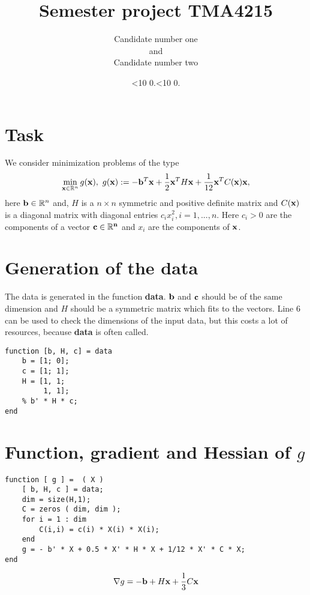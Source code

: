 \documentclass[a4paper,12pt]{article}
\newcommand{\leadingzero}[1]{\ifnum #1<10 0\the#1\else\the#1\fi}
\newcommand{\mytoday}{\leadingzero{\day}.\leadingzero{\month}.\the\year}
\newcommand{\code}[1]{\textbf{#1}}
\begin{document}
\title{Semester project TMA4215}
\author{Candidate number one \\ and\\ Candidate number two}
\date{\mytoday}
\maketitle
\newpage


\section{Task}
We consider minimization problems of the type
\begin{align*}
\min_{{\bf x} \in \mathbb{R}^n} g({\bf x}),\,\, g({\bf x}):=-{\bf b}^T{\bf x} + \frac12{\bf x}^TH{\bf x}+\frac1{12}{\bf x}^TC({\bf x}){\bf x},
\end{align*}
here ${\bf b} \in \mathbb{R}^n$ and, $H$ is a $n \times n$ symmetric and positive definite matrix and $C(\bf{x})$ is a diagonal
matrix with diagonal entries $c_i x^2_i, i = 1, . . . , n$. 
Here $c_i > 0$ are the components of a vector $\bf{c} \in \mathbb{R}^n$ 
and $x_i$ are the components of $\bf{x}$. 
\section{Generation of the data}
The data is generated in the function \code{data}.
$\bf{b}$ and $\bf{c}$ should be of the same dimension and $H$ should be a symmetric matrix which fits to the vectors.
Line 6 can be used to check the dimensions of the input data, but this costs a lot of resources, because \code{data} is often called. 
\begin{lstlisting}
function [b, H, c] = data
	b = [1; 0];
	c = [1; 1];
	H = [1, 1;
	     1, 1];
	% b' * H * c;
end
\end{lstlisting}

\section{Function, gradient and Hessian of $g$}

\begin{lstlisting}
function [ g ] =  ( X )
	[ b, H, c ] = data;
	dim = size(H,1);
	C = zeros ( dim, dim );
	for i = 1 : dim
		C(i,i) = c(i) * X(i) * X(i);
	end
	g = - b' * X + 0.5 * X' * H * X + 1/12 * X' * C * X;
end
\end{lstlisting}

\begin{align}\label{grad}
{\bf\nabla} g = -{\bf b} + H{\bf x} + \frac13C{\bf x}
\end{align}
\end{document}
